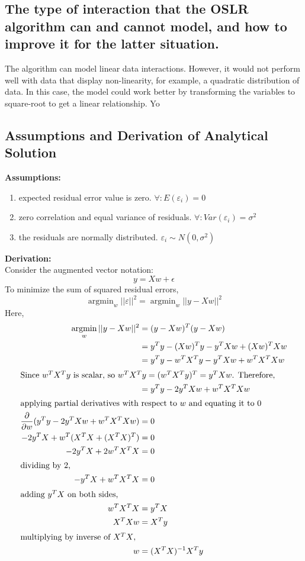 \subsection{The type of interaction that the OSLR algorithm can and cannot model, and how to improve it for the latter situation.}
    The algorithm can model linear data interactions. However, it would not perform well with data that display non-linearity, for example, a quadratic distribution of data. In this case, the model could work better by transforming the variables to square-root to get a linear relationship. Yo
    
    \subsection{Assumptions and Derivation of Analytical Solution}
    \textbf{Assumptions:}
    \begin{enumerate}
    \item expected residual error value is zero. $\forall : E(\varepsilon_i) = 0$
    \item zero correlation and equal variance of residuals. $\forall : Var(\varepsilon_i) = \sigma^2$
   \item the residuals are normally distributed. $\varepsilon_i \sim N(0,\sigma^2)$
   \end{enumerate}
   \textbf {Derivation:}\\
    Consider the augmented vector notation:
    \begin{equation*}
        y = Xw + \epsilon
    \end{equation*}
    To minimize the sum of squared residual errors,
    \newcommand{\argmin}{\mathop{\mathrm{argmin}}}
    \begin{equation*}
        \argmin_w ||\varepsilon||^2 = \argmin_w ||y - Xw||^2
    \end{equation*}
    Here,
    \begin{align*}
        \argmin_w ||y - Xw||^2 &= (y-Xw)^T (y-Xw)\\
        &= y^Ty - (Xw)^Ty - y^TXw + (Xw)^TXw\\
        &= y^Ty - w^TX^Ty - y^TXw + w^TX^TXw\\
        \intertext{Since $w^TX^Ty$ is scalar, so $w^TX^Ty = (w^TX^Ty)^T = y^TXw$. Therefore,} 
        &= y^Ty - 2y^TXw + w^TX^TXw\\
        \intertext{applying partial derivatives with respect to $w$ and equating it to 0}
        \frac{\partial}{\partial w} (y^Ty - 2y^TXw + w^TX^TXw)   &= 0\\
        - 2y^TX + w^T(X^TX + (X^TX)^T) &= 0\\
        - 2y^TX + 2w^TX^TX &= 0\\
         \intertext{dividing by 2,}
        - y^TX + w^TX^TX &= 0\\
        \intertext{adding $y^TX$ on both sides,}
        w^TX^TX &= y^TX\\
        X^TXw &= X^Ty\\
        \intertext{multiplying by inverse of $X^TX$,}
        w &= (X^TX)^{-1}X^Ty
    \end{align*}
